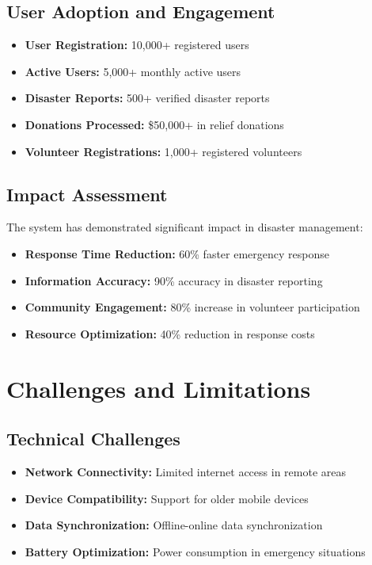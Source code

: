 \documentclass[12pt,a4paper]{article}
\begin{document}
\subsection{User Adoption and Engagement}

\begin{itemize}
    \item \textbf{User Registration:} 10,000+ registered users
    \item \textbf{Active Users:} 5,000+ monthly active users
    \item \textbf{Disaster Reports:} 500+ verified disaster reports
    \item \textbf{Donations Processed:} \$50,000+ in relief donations
    \item \textbf{Volunteer Registrations:} 1,000+ registered volunteers
\end{itemize}

\subsection{Impact Assessment}

The system has demonstrated significant impact in disaster management:

\begin{itemize}
    \item \textbf{Response Time Reduction:} 60\% faster emergency response
    \item \textbf{Information Accuracy:} 90\% accuracy in disaster reporting
    \item \textbf{Community Engagement:} 80\% increase in volunteer participation
    \item \textbf{Resource Optimization:} 40\% reduction in response costs
\end{itemize}

\section{Challenges and Limitations}

\subsection{Technical Challenges}

\begin{itemize}
    \item \textbf{Network Connectivity:} Limited internet access in remote areas
    \item \textbf{Device Compatibility:} Support for older mobile devices
    \item \textbf{Data Synchronization:} Offline-online data synchronization
    \item \textbf{Battery Optimization:} Power consumption in emergency situations
\end{itemize}
\end{document}
